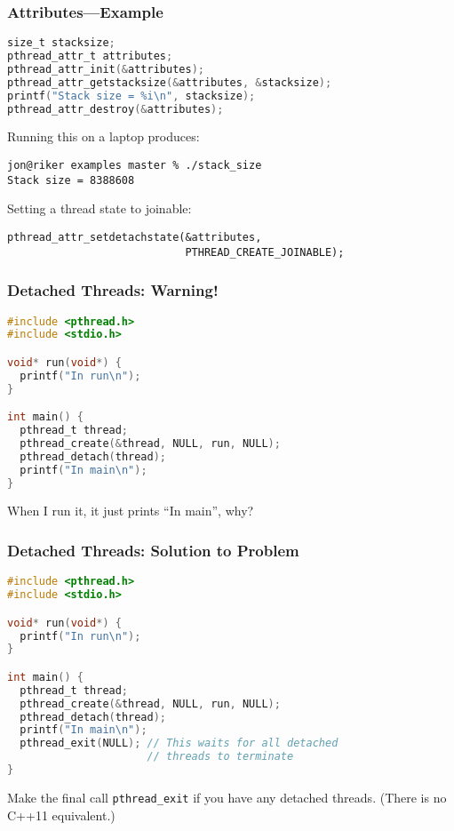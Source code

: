 \begin{frame}[fragile]
  \frametitle{Attributes---Example}


  \begin{lstlisting}[language=C]
size_t stacksize;
pthread_attr_t attributes;
pthread_attr_init(&attributes);
pthread_attr_getstacksize(&attributes, &stacksize);
printf("Stack size = %i\n", stacksize);
pthread_attr_destroy(&attributes);
  \end{lstlisting}
Running this on a laptop produces:
  \begin{lstlisting}
jon@riker examples master % ./stack_size 
Stack size = 8388608
  \end{lstlisting}
  Setting a thread state to joinable:
  \begin{lstlisting}
pthread_attr_setdetachstate(&attributes,
                            PTHREAD_CREATE_JOINABLE);
  \end{lstlisting}


\end{frame}

\begin{frame}[fragile]
  \frametitle{Detached Threads: Warning!}


\begin{lstlisting}[language=C]
#include <pthread.h>
#include <stdio.h>

void* run(void*) {
  printf("In run\n");
}

int main() {
  pthread_t thread;
  pthread_create(&thread, NULL, run, NULL);
  pthread_detach(thread);
  printf("In main\n");
}
\end{lstlisting}

  When I run it, it just prints ``In main'', why?


\end{frame}

\begin{frame}[fragile]
  \frametitle{Detached Threads: Solution to Problem}

  \begin{lstlisting}[language=C]
#include <pthread.h>
#include <stdio.h>

void* run(void*) {
  printf("In run\n");
}

int main() {
  pthread_t thread;
  pthread_create(&thread, NULL, run, NULL);
  pthread_detach(thread);
  printf("In main\n");
  pthread_exit(NULL); // This waits for all detached
                      // threads to terminate
}
  \end{lstlisting}

  Make the final call {\tt pthread\_exit} if you have any detached threads. (There is no C++11 equivalent.)

\end{frame}

